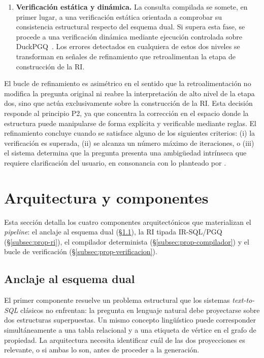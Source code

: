 \begin{enumerate}
    \item \textbf{Verificación estática y dinámica.} La consulta compilada se
    somete, en primer lugar, a una verificación estática orientada a comprobar
    su consistencia estructural respecto del esquema dual. Si supera esta
    fase, se procede a una verificación dinámica mediante ejecución controlada
    sobre DuckPGQ~\cite{DuckPGQ}. Los errores detectados en cualquiera de
    estos dos niveles se transforman en señales de refinamiento que
    retroalimentan la etapa de construcción de la \ac{RI}.
\end{enumerate}

El bucle de refinamiento es asimétrico en el sentido que la
retroalimentación no modifica la pregunta original ni reabre la interpretación
de alto nivel de la etapa dos, sino que actúa exclusivamente sobre la %
construcción de la \ac{RI}. Esta decisión responde al principio P2, ya que
concentra la corrección en el espacio donde la estructura puede manipularse de
forma explícita y verificable mediante reglas. El refinamiento concluye cuando
se satisface alguno de los siguientes criterios: (i) la verificación es
superada, (ii) se alcanza un número máximo de iteraciones, o (iii) el sistema
determina que la pregunta presenta una ambigüedad intrínseca que requiere
clarificación del usuario, en consonancia con lo planteado por %
\cite{AmbiSQL}.



\section{Arquitectura y componentes}
\label{sec:prop-arquitectura}

Esta sección detalla los cuatro componentes arquitectónicos que materializan el \emph{pipeline}: el anclaje al esquema dual (\S\ref{subsec:prop-anclaje}), la \ac{RI} tipada IR-SQL/PGQ (\S\ref{subsec:prop-ri}), el compilador determinista (\S\ref{subsec:prop-compilador}) y el bucle de verificación (\S\ref{subsec:prop-verificacion}). %

\subsection{Anclaje al esquema dual}
\label{subsec:prop-anclaje}

El primer componente resuelve un problema estructural que los sistemas \emph{text-to-SQL} clásicos no enfrentan: la pregunta en lenguaje natural debe proyectarse sobre dos estructuras superpuestas. Un mismo concepto lingüístico puede corresponder simultáneamente a una tabla relacional y a una etiqueta de vértice en el grafo de propiedad. La arquitectura necesita identificar cuál de las dos proyecciones es relevante, o si ambas lo son, antes de proceder a la generación.

